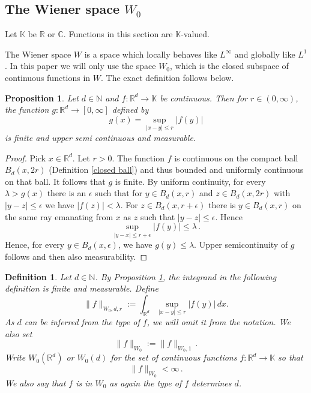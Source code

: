 \documentclass[12pt,reqno]{amsart}
\theoremstyle{plain}
\newtheorem{proposition}[theorem]{Proposition}
\newtheorem{definition}[theorem]{Definition}
\numberwithin{equation}{section}
\theoremstyle{remark}
\newcommand{\uses}[1]{}
\newcommand{\usesdefs}[1]{}
\newcommand{\R}{{\mathbb R}}
\newcommand{\N}{{\mathbb N}}
\newcommand{\C}{{\mathbb C}}
\begin{document}
\subsection{The Wiener space \texorpdfstring{$W_0$}{}}
Let $\mathbb{K}$ be $\R$ or $\C$.
Functions in this section are $\mathbb{K}$-valued.


The  Wiener space $W$ is a space which locally behaves like $L^\infty$ and globally like $L^1$
\cite{Wiener32,Groechenig}. In this paper we will only use the space $W_0$, which is the closed subspace of continuous functions in $W$.
The exact definition follows below.

\begin{proposition}\label{auto:local-supremum-measurability}\uses{}\usesdefs{closed ball}
Let $d\in \N$ and $f:\R^d\to \mathbb{K}$ be continuous.
Then for $r\in (0,\infty)$, the function $g:\R^d\to [0,\infty]$  defined by
\begin{equation}\label{auto:local-supremum-function}
    g(x)=\sup_{|x-y|\le r}|f(y)|
\end{equation}
is finite and upper semi continuous and measurable.
\end{proposition}
\begin{proof}
 Pick $x\in \R^d$. Let $r>0$.
 The function $f$ is continuous on the compact ball $B_d(x,2r)$ (Definition \ref{closed ball}) and thus bounded and uniformly continuous on that ball. It follows that $g$ is finite. By uniform continuity, for every $\lambda>g(x)$ there is an $\epsilon$ such that for $y\in B_d(x,r)$ and $z\in B_d(x,2r)$ with $|y-z|\le \epsilon$ we have
 $|f(z)|<\lambda$. For $z\in B_d(x,r+\epsilon)$
 there is $y\in B_d(x,r)$ on the same ray emanating from $x$ as $z$ such that $|y-z|\le \epsilon$.
 Hence
 \begin{equation}
     \sup_{|y-x|\le r+\epsilon}|f(y)|\le \lambda \, .
 \end{equation}
 Hence, for  every $y\in B_d(x,\epsilon)$, we have
 $g(y)\le \lambda$. Upper semicontinuity of $g$ follows and then also measurability.
 \end{proof}

\begin{definition}\label{auto:Wiener-space-definition}\uses{auto:local-supremum-measurability}\usesdefs{}
Let $d\in \N$.  By Proposition \ref{auto:local-supremum-measurability}, the integrand in the following definition is finite and measurable. Define
\begin{equation}\label{auto:Wiener-local-norm}
\|f\|_{W_0,d,r}:=    \int_{\R^d} \sup_{|x-y|\le r} |f(y)|\,dx.
\end{equation}
As $d$ can be inferred from the type of $f$, we
will omit it from the notation.
We also set
\begin{equation}\label{auto:Wiener-norm}
    \|f\|_{W_0}:=\|f\|_{W_0,1}\, .
\end{equation}
Write $W_0(\R^d)$ or $W_0(d)$ for the set of continuous functions $f:\R^d\to\mathbb{K}$ so that
\begin{equation}\label{auto:Wiener-space-finiteness}  \|f\|_{W_0}< \infty\, . \end{equation}
We also say that $f$ is in $W_0$ as again the type of $f$
determines $d$.
\end{definition}
\end{document}
